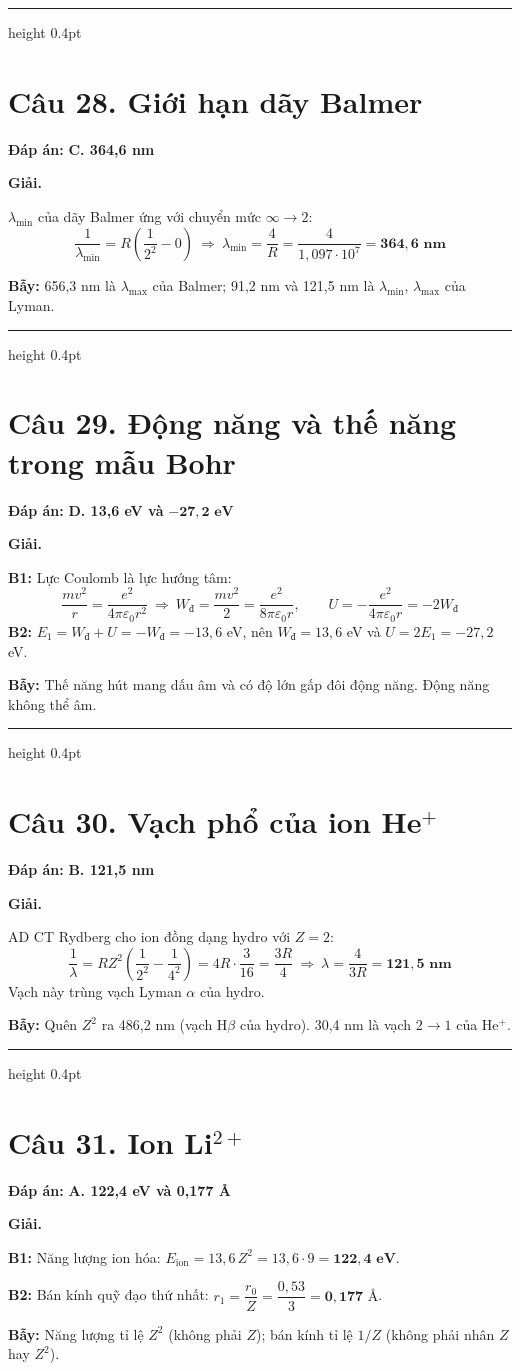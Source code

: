 \documentclass[11pt,a4paper]{article}
\renewcommand{\boldsymbol}[1]{\symbf{#1}}
\newcommand{\Wd}{W_{\text{đ}}}
\newcommand{\Cau}[2]{\par\Needspace{7\baselineskip}\section*{Câu #1. #2}}
\newcommand{\DapAn}[1]{\textbf{Đáp án:} #1\par}
\newcommand{\Bay}[1]{\par\textbf{Bẫy:} #1\par}
\newcommand{\PhanCachBai}{%
  \par\Needspace{7\baselineskip}%
  \addvspace{6pt}%
  {\color{black!40}\hrule height 0.4pt}%
  \nobreak\vspace{7pt}\nobreak
}
\begin{document}
\PhanCachBai
\Cau{28}{Giới hạn dãy Balmer}
\DapAn{\textbf{C. 364,6 nm}}

\textbf{Giải.}

$\lambda_{\min}$ của dãy Balmer ứng với chuyển mức $\infty\to2$:
\begin{equation*}
    \frac1{\lambda_{\min}}=R\left(\frac1{2^2}-0\right)\ \Longrightarrow\ \lambda_{\min}=\frac4R=\frac{4}{1{,}097\cdot10^{7}}=\boldsymbol{364{,}6\text{ nm}}
\end{equation*}
\Bay{656,3 nm là $\lambda_{\max}$ của Balmer; 91,2 nm và 121,5 nm là $\lambda_{\min}$, $\lambda_{\max}$ của Lyman.}

\PhanCachBai
\Cau{29}{Động năng và thế năng trong mẫu Bohr}
\DapAn{\textbf{D. 13,6 eV và} $\boldsymbol{-27{,}2\text{ eV}}$}

\textbf{Giải.}

\textbf{B1:} Lực Coulomb là lực hướng tâm:
\begin{equation*}
    \frac{mv^2}{r}=\frac{e^2}{4\pi\varepsilon_0r^2}\ \Longrightarrow\ \Wd=\frac{mv^2}{2}=\frac{e^2}{8\pi\varepsilon_0r},\qquad U=-\frac{e^2}{4\pi\varepsilon_0r}=-2\Wd
\end{equation*}
\textbf{B2:} $E_1=\Wd+U=-\Wd=-13{,}6$ eV, nên $\Wd=13{,}6$ eV và $U=2E_1=-27{,}2$ eV.
\Bay{Thế năng hút mang dấu âm và có độ lớn gấp đôi động năng. Động năng không thể âm.}

\PhanCachBai
\Cau{30}{Vạch phổ của ion He$^{+}$}
\DapAn{\textbf{B. 121,5 nm}}

\textbf{Giải.}

AD CT Rydberg cho ion đồng dạng hydro với $Z=2$:
\begin{equation*}
    \frac1\lambda=RZ^2\left(\frac1{2^2}-\frac1{4^2}\right)=4R\cdot\frac{3}{16}=\frac{3R}{4}\ \Longrightarrow\ \lambda=\frac{4}{3R}=\boldsymbol{121{,}5\text{ nm}}
\end{equation*}
Vạch này trùng vạch Lyman $\alpha$ của hydro.
\Bay{Quên $Z^2$ ra 486,2 nm (vạch H$\beta$ của hydro). 30,4 nm là vạch $2\to1$ của He$^{+}$.}

\PhanCachBai
\Cau{31}{Ion Li$^{2+}$}
\DapAn{\textbf{A. 122,4 eV và 0,177 Å}}

\textbf{Giải.}

\textbf{B1:} Năng lượng ion hóa: $E_{\text{ion}}=13{,}6\,Z^2=13{,}6\cdot9=\boldsymbol{122{,}4\text{ eV}}$.

\textbf{B2:} Bán kính quỹ đạo thứ nhất: $r_1=\dfrac{r_0}{Z}=\dfrac{0{,}53}{3}=\boldsymbol{0{,}177\text{ Å}}$.
\Bay{Năng lượng tỉ lệ $Z^2$ (không phải $Z$); bán kính tỉ lệ $1/Z$ (không phải nhân $Z$ hay $Z^2$).}
\end{document}
